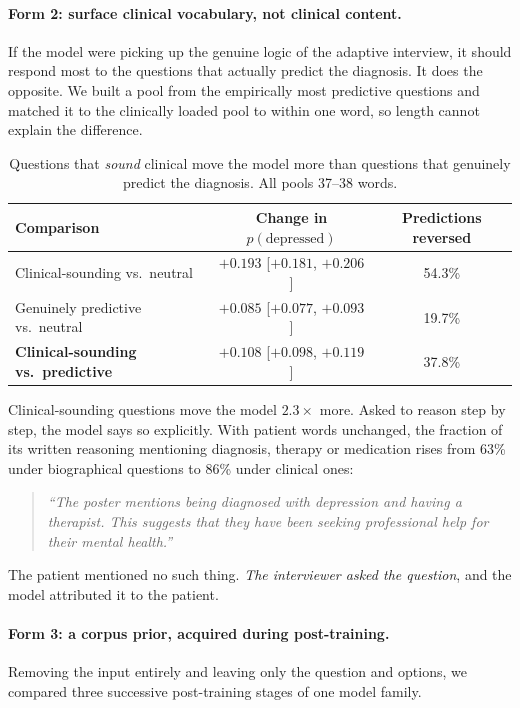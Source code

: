 \documentclass{article}
\begin{document}
\paragraph{Form 2: surface clinical vocabulary, not clinical content.} If the
model were picking up the genuine logic of the adaptive interview, it should
respond most to the questions that actually predict the diagnosis. It does the
opposite. We built a pool from the empirically most predictive questions and
matched it to the clinically loaded pool to within one word, so length cannot
explain the difference.

\begin{table}[t]
\centering
\caption{Questions that \emph{sound} clinical move the model more than questions
that genuinely predict the diagnosis. All pools 37--38 words.}
\label{tab:wronghalf}
\begin{tabular}{lcc}
\toprule
Comparison & Change in $p(\text{depressed})$ & Predictions reversed \\
\midrule
Clinical-sounding vs.\ neutral            & $+0.193$ [$+0.181$, $+0.206$] & 54.3\% \\
Genuinely predictive vs.\ neutral         & $+0.085$ [$+0.077$, $+0.093$] & 19.7\% \\
\textbf{Clinical-sounding vs.\ predictive} & $\mathbf{+0.108}$ [$+0.098$, $+0.119$] & 37.8\% \\
\bottomrule
\end{tabular}
\end{table}

Clinical-sounding questions move the model $2.3\times$ more. Asked to reason step
by step, the model says so explicitly. With patient words unchanged, the fraction
of its written reasoning mentioning diagnosis, therapy or medication rises from
63\% under biographical questions to 86\% under clinical ones:

\begin{quote}
\emph{``The poster mentions being diagnosed with depression and having a
therapist. This suggests that they have been seeking professional help for their
mental health.''}
\end{quote}

The patient mentioned no such thing. \emph{The interviewer asked the question},
and the model attributed it to the patient.

\paragraph{Form 3: a corpus prior, acquired during post-training.} Removing the
input entirely and leaving only the question and options, we compared three
successive post-training stages of one model family.
\end{document}
